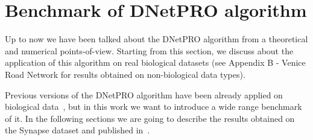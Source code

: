 \documentclass{standalone}
\begin{document}
\section[Benchmark]{Benchmark of DNetPRO algorithm}\label{synapse:benchmark}

Up to now we have been talked about the \textsf{DNetPRO} algorithm from a theoretical and numerical points-of-view.
Starting from this section, we discuss about the application of this algorithm on real biological datasets (see Appendix B - Venice Road Network for results obtained on non-biological data types).

Previous versions of the \textsf{DNetPRO} algorithm have been already applied on biological data~\cite{PMrna, Scotlandi2009, PMgene, Terragna}, but in this work we want to introduce a wide range benchmark of it.
In the following sections we are going to describe the results obtained on the Synapse dataset and published in~\cite{Curti2019}.
\end{document}

